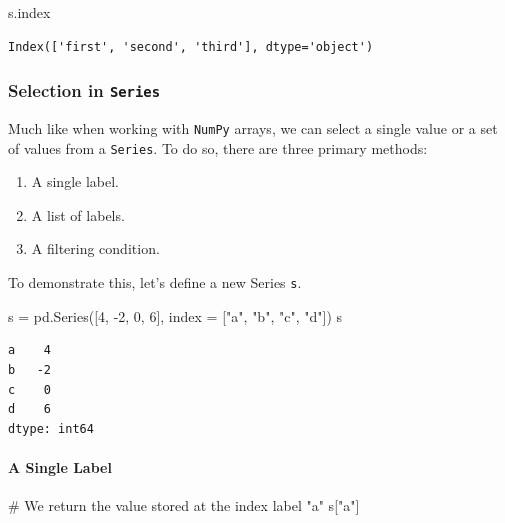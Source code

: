\documentclass[
  letterpaper,
  DIV=11,
  numbers=noendperiod]{scrreprt}
\let\oldparagraph\paragraph
\renewcommand{\paragraph}[1]{\oldparagraph{#1}\mbox{}}
\newenvironment{Shaded}{\begin{snugshade}}{\end{snugshade}}
\newcommand{\CommentTok}[1]{\textcolor[rgb]{0.37,0.37,0.37}{#1}}
\newcommand{\DecValTok}[1]{\textcolor[rgb]{0.68,0.00,0.00}{#1}}
\newcommand{\NormalTok}[1]{\textcolor[rgb]{0.00,0.23,0.31}{#1}}
\newcommand{\OperatorTok}[1]{\textcolor[rgb]{0.37,0.37,0.37}{#1}}
\newcommand{\StringTok}[1]{\textcolor[rgb]{0.13,0.47,0.30}{#1}}
\providecommand{\tightlist}{%
  \setlength{\itemsep}{0pt}\setlength{\parskip}{0pt}}\usepackage{longtable,booktabs,array}
\begin{document}
\begin{Shaded}
\begin{Highlighting}[]
\NormalTok{s.index}
\end{Highlighting}
\end{Shaded}

\begin{verbatim}
Index(['first', 'second', 'third'], dtype='object')
\end{verbatim}

\subsubsection{\texorpdfstring{Selection in
\texttt{Series}}{Selection in Series}}\label{selection-in-series}

Much like when working with \texttt{NumPy} arrays, we can select a
single value or a set of values from a \texttt{Series}. To do so, there
are three primary methods:

\begin{enumerate}
\def\labelenumi{\arabic{enumi}.}
\tightlist
\item
  A single label.
\item
  A list of labels.
\item
  A filtering condition.
\end{enumerate}

To demonstrate this, let's define a new Series \texttt{s}.

\begin{Shaded}
\begin{Highlighting}[]
\NormalTok{s }\OperatorTok{=}\NormalTok{ pd.Series([}\DecValTok{4}\NormalTok{, }\OperatorTok{{-}}\DecValTok{2}\NormalTok{, }\DecValTok{0}\NormalTok{, }\DecValTok{6}\NormalTok{], index }\OperatorTok{=}\NormalTok{ [}\StringTok{"a"}\NormalTok{, }\StringTok{"b"}\NormalTok{, }\StringTok{"c"}\NormalTok{, }\StringTok{"d"}\NormalTok{])}
\NormalTok{s}
\end{Highlighting}
\end{Shaded}

\begin{verbatim}
a    4
b   -2
c    0
d    6
dtype: int64
\end{verbatim}

\paragraph{A Single Label}\label{a-single-label}

\begin{Shaded}
\begin{Highlighting}[]
\CommentTok{\# We return the value stored at the index label "a"}
\NormalTok{s[}\StringTok{"a"}\NormalTok{] }
\end{Highlighting}
\end{Shaded}
\end{document}
